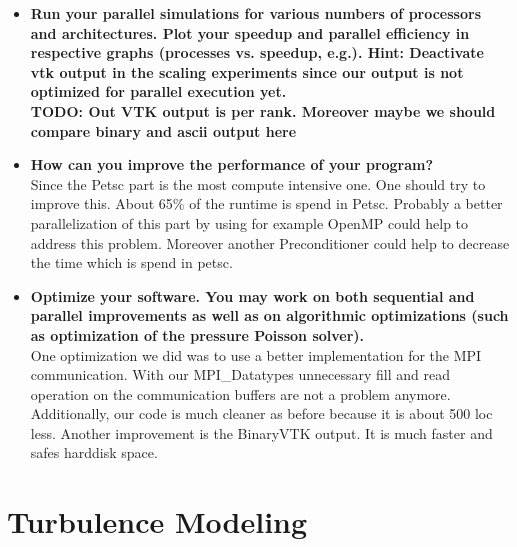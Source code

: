 \documentclass[a4paper]{article}
\newcommand{\td}[1]{
	\textbf{\color{red}TODO: {#1}}
}
\begin{document}
\begin{itemize}
	\item \textbf{Run your parallel simulations for various numbers of processors and architectures. Plot your speedup and parallel efficiency in respective graphs (processes vs. speedup, e.g.). Hint: Deactivate vtk output in the scaling experiments since our output is not optimized for parallel execution yet.}\\
	\td{Out VTK output is per rank. Moreover maybe we should compare binary and ascii output here}
	\item\textbf{How can you improve the performance of your program?}\\
	Since the Petsc part is the most compute intensive one. One should try to improve this. About 65\% of the runtime is spend in Petsc. Probably a better parallelization of this part by using for example OpenMP could help to address this problem. Moreover another Preconditioner could help to decrease the time which is spend in petsc.
	\item\textbf{Optimize your software. You may work on both sequential and parallel improvements as well as on algorithmic optimizations (such as optimization of the pressure Poisson solver).}\\
	One optimization we did was to use a better implementation for the MPI communication. With our MPI\_Datatypes unnecessary fill and read operation on the communication buffers are not a problem anymore. Additionally, our code is much cleaner as before because it is about 500 loc less.
	Another improvement is the BinaryVTK output. It is much faster and safes harddisk space.
\end{itemize}

\section{Turbulence Modeling}
\end{document}
